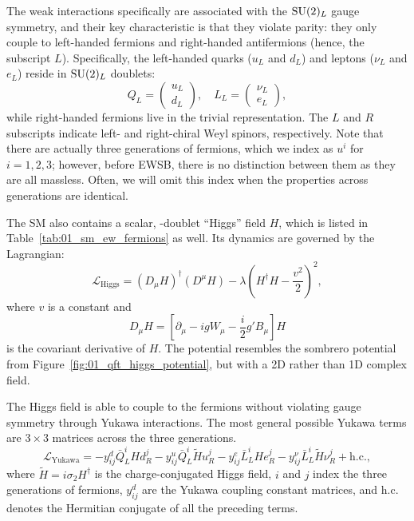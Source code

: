 The weak interactions specifically are associated with the $\SU[2]_L$ gauge symmetry, and their key characteristic is that they violate parity: they only couple to left-handed fermions and right-handed antifermions (hence, the subscript $L$).
Specifically, the left-handed quarks ($u_L$ and $d_L$) and leptons ($\nu_L$ and $e_L$) reside in $\SU[2]_L$ doublets:
\begin{equation}
	\label{eq:01_sm_ew_doublets}
	Q_L = \begin{pmatrix} u_L \\ d_L \end{pmatrix}, \quad L_L = \begin{pmatrix} \nu_L \\ e_L \end{pmatrix},
\end{equation}
while right-handed fermions live in the trivial representation.
The $L$ and $R$ subscripts indicate left- and right-chiral Weyl spinors, respectively.
Note that there are actually three generations of fermions, which we index as $u^i$ for $i = 1, 2, 3$; however, before EWSB, there is no distinction between them as they are all massless.
Often, we will omit this index when the properties across generations are identical.

The SM also contains a scalar, \SU[2]-doublet ``Higgs'' field $H$, which is listed in Table~\ref{tab:01_sm_ew_fermions} as well.
Its dynamics are governed by the Lagrangian:
\begin{equation}
	\label{eq:01_sm_ew_higgs_lagrangian}
	\mathcal{L}_{\mathrm{Higgs}} = (D_\mu H)^\dagger (D^\mu H) - \lambda (H^\dagger H - \frac{v^2}{2})^2,
\end{equation}
where $v$ is a constant and
\begin{equation}
	\label{eq:01_sm_ew_higgs_derivative}
	D_\mu H = \left[\partial_\mu - igW_\mu - \frac{i}{2} g' B_\mu\right]H
\end{equation}
is the covariant derivative of $H$.
The potential resembles the sombrero potential from Figure~\ref{fig:01_qft_higgs_potential}, but with a 2D rather than 1D complex field.

The Higgs field is able to couple to the fermions without violating gauge symmetry through Yukawa interactions.
The most general possible Yukawa terms are $3 \times 3$ matrices across the three generations.
\begin{equation}
	\label{eq:01_sm_ew_yukawa}
	\mathcal{L}_{\mathrm{Yukawa}} = -y^d_{ij} \bar{Q}^i_L H d^j_R - y^u_{ij} \bar{Q}^i_L \tilde H u^j_R - y^e_{ij} \bar{L}^i_L H e^j_R - y^\nu_{ij} \bar{L}^i_L \tilde H \nu^j_R + \text{h.c.},
\end{equation}
where $\tilde H = i\sigma_2 H^\dagger$ is the charge-conjugated Higgs field, $i$ and $j$ index the three generations of fermions, $y^d_{ij}$ are the Yukawa coupling constant matrices, and h.c. denotes the Hermitian conjugate of all the preceding terms.

